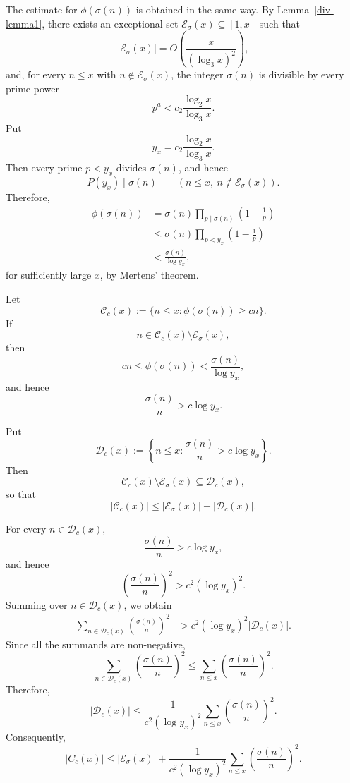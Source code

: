 \documentclass{article}
\theoremstyle{remark}
\begin{document}
The estimate for \(\phi(\sigma(n))\) is obtained in the same way.
By Lemma~\ref{div-lemma1}, there exists an exceptional set
\(\mathcal E_\sigma(x)\subseteq[1,x]\) such that
\[
        |\mathcal E_\sigma(x)|
        =
        O\left(\frac{x}{(\log_3x)^2}\right),
\]
and, for every \(n\le x\) with
\(n\notin\mathcal E_\sigma(x)\), the integer \(\sigma(n)\) is divisible
by every prime power
\[
        p^a<c_2\frac{\log_2x}{\log_3x}.
\]
Put
\[
        y_x=c_2\frac{\log_2x}{\log_3x}.
\]
Then every prime \(p<y_x\) divides \(\sigma(n)\), and hence
\[
        P(y_x)\mid\sigma(n)
        \qquad
        (n\le x,\ n\notin\mathcal E_\sigma(x)).
\]
Therefore,
\[
\begin{aligned}
 \phi(\sigma(n))
 &=
 \sigma(n)
 \prod_{p\mid\sigma(n)}
 \left(1-\frac1p\right)\\
 &\leq
 \sigma(n)
 \prod_{p<y_x}
 \left(1-\frac1p\right)\\
 &<
 \frac{\sigma(n)}{\log y_x},
\end{aligned}
\]
for sufficiently large \(x\), by Mertens' theorem.

Let
\[
        \mathcal C_c(x)
        :=
        \{n\le x:\phi(\sigma(n))\ge cn\}.
\]
If
\[
        n\in
        \mathcal C_c(x)\setminus\mathcal E_\sigma(x),
\]
then
\[
        cn
        \leq
        \phi(\sigma(n))
        <
        \frac{\sigma(n)}{\log y_x},
\]
and hence
\[
        \frac{\sigma(n)}n
        >
        c\log y_x.
\]

Put
\[
        \mathcal D_c(x)
        :=
        \left\{
        n\le x:
        \frac{\sigma(n)}n>c\log y_x
        \right\}.
\]
Then
\[
        \mathcal C_c(x)\setminus\mathcal E_\sigma(x)
        \subseteq
        \mathcal D_c(x),
\]
so that
\[
        |\mathcal C_c(x)|
        \leq
        |\mathcal E_\sigma(x)|
        +
        |\mathcal D_c(x)|.
\]

For every \(n\in\mathcal D_c(x)\),
\[
        \frac{\sigma(n)}n>c\log y_x,
\]
and hence
\[
        \left(\frac{\sigma(n)}n\right)^2
        >
        c^2(\log y_x)^2.
\]
Summing over \(n\in\mathcal D_c(x)\), we obtain
\[
\begin{aligned}
 \sum_{n\in\mathcal D_c(x)}
 \left(\frac{\sigma(n)}n\right)^2
 &>
 c^2(\log y_x)^2
 |\mathcal D_c(x)|.
\end{aligned}
\]
Since all the summands are non-negative,
\[
        \sum_{n\in\mathcal D_c(x)}
        \left(\frac{\sigma(n)}n\right)^2
        \leq
        \sum_{n\le x}
        \left(\frac{\sigma(n)}n\right)^2.
\]
Therefore,
\[
        |\mathcal D_c(x)|
        \leq
        \frac1{c^2(\log y_x)^2}
        \sum_{n\le x}
        \left(\frac{\sigma(n)}n\right)^2.
\]
Consequently,
\[
|C_c(x)|
\leq
|\mathcal E_\sigma(x)|
+
\frac{1}{c^2(\log y_x)^2}
\sum_{n\leq x}
\left(\frac{\sigma(n)}{n}\right)^2.
\]
\end{document}
